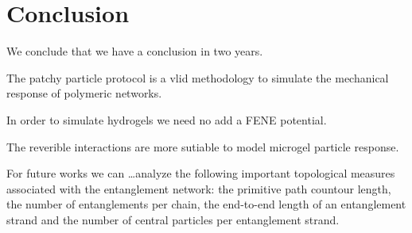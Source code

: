 \chapter{Conclusion}

We conclude that we have a conclusion in two years.

The patchy particle protocol is a vlid methodology to simulate the mechanical response of polymeric networks.

In order to simulate hydrogels we need no add a FENE potential.

The reverible interactions are more sutiable to model microgel particle response.

For future works we can \dots analyze the following important topological measures associated with the entanglement network: the primitive path countour length, the number of entanglements per chain, the end-to-end length of an entanglement strand and the number of central particles per entanglement strand.



